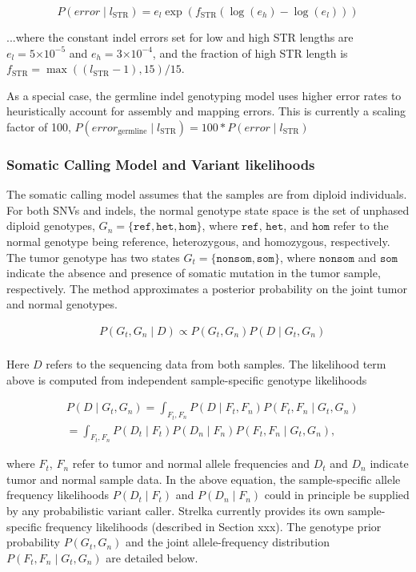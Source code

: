 \documentclass{article}
\newcommand{\e}[1]{\ensuremath{\times 10^{#1}}}
\begin{document}
\begin{equation*}
P(error \mid l_{\text{STR}}) = e_{l} \exp(f_{\text{STR}}(\log(e_{h})-\log(e_{l})))
\end{equation*}

\noindent ...where the constant indel errors set for low and high STR lengths are $e_{l} = 5\e{-5}$ and $e_{h} = 3\e{-4}$, and the fraction of high STR length is $f_{\text{STR}} = \max((l_{\text{STR}}-1),15)/15$.

As a special case, the germline indel genotyping model uses higher error rates to heuristically account for assembly and mapping errors. This is currently a scaling factor of 100, $P(error_{\text{germline}} \mid l_{\text{STR}}) = 100 * P(error \mid l_{\text{STR}})$


\subsubsection{Somatic Calling Model and Variant likelihoods}

The somatic calling model assumes that the samples are from diploid individuals. For both SNVs and indels, the normal genotype state space is the set of unphased diploid genotypes, $G_n = \{ \texttt{ref}, \texttt{het}, \texttt{hom}\}$, where $\texttt{ref}$, $\texttt{het}$, and $\texttt{hom}$ refer to the normal genotype being reference, heterozygous, and homozygous, respectively. The tumor genotype has two states $G_t = \{ \texttt{nonsom}, \texttt{som} \}$, where $\texttt{nonsom}$ and $\texttt{som}$ indicate the absence and presence of somatic mutation in the tumor sample, respectively. The method approximates a posterior probability on the joint tumor and normal genotypes.

\begin{align*}
	& P(G_t,G_n \mid D) \propto P(G_t,G_n) P(D \mid G_t,G_n) \\
\end{align*}


Here $D$ refers to the sequencing data from both samples. The likelihood term above is computed from independent sample-specific genotype likelihoods

\begin{align*}
	& P(D \mid G_t,G_n) = \int_{F_t,F_n}{P(D \mid F_t,F_n)P(F_t,F_n \mid G_t,G_n)} \\
	& = \int_{F_t,F_n}{P(D_t \mid F_t)P(D_n \mid F_n)P(F_t,F_n \mid G_t,G_n)},
\end{align*}

\noindent where $F_t$, $F_n$ refer to tumor and normal allele frequencies and $D_t$ and $D_n$ indicate tumor and normal sample data. In the above equation, the sample-specific allele frequency likelihoods $P(D_t \mid F_t)$ and $P(D_n \mid F_n)$ could in principle be supplied by any probabilistic variant caller. Strelka currently provides its own sample-specific frequency likelihoods (described in Section xxx). The genotype prior probability $P(G_t, G_n)$ and the joint allele-frequency distribution $P(F_t,F_n \mid G_t,G_n)$ are detailed below.
\end{document}
